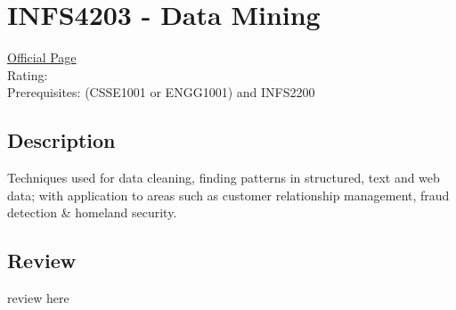 \hypertarget{INFS4203}{\section{INFS4203 - Data Mining}}

\large
\textcolor{turbo_purple}{\href{https://my.uq.edu.au/programs-courses/course.html?course_code=INFS4203}{Official Page}} \\
Rating: \cstar\cstar\cstar\cstar\ostar \\
Prerequisites: (CSSE1001 or ENGG1001) and INFS2200

\normalsize
\subsection*{Description}
Techniques used for data cleaning, finding patterns in structured, text and web data; with application to areas such as customer relationship management, fraud detection \& homeland security.

\subsection*{Review}
review here
